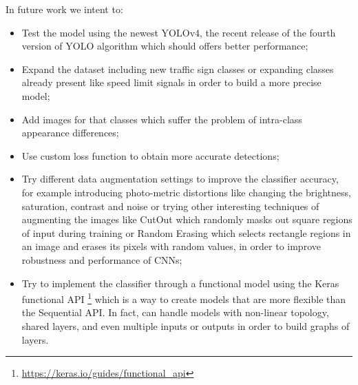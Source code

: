 \documentclass[10pt,twocolumn,letterpaper]{article}
\begin{document}
\noindent In future work we intent to:
\begin{itemize}[noitemsep,topsep=0pt]
	\item Test the model using the newest YOLOv4, the recent release of the fourth version of YOLO algorithm which should offers better performance;
	\item Expand the dataset including new traffic sign classes or expanding classes already present like speed limit signals in order to build a more precise model;
	\item Add images for that classes which suffer the problem of intra-class appearance differences;
	\item Use custom loss function to obtain more accurate detections;
	\item Try different data augmentation settings to improve the classifier accuracy, for example introducing photo-metric distortions like changing the brightness, saturation, contrast and noise or trying other interesting techniques of augmenting the images like CutOut\cite{cutout} which randomly masks out square regions of input during training  or Random Erasing\cite{random} which selects rectangle regions in an image and erases its pixels with random values, in order to improve robustness and performance of CNNs;
	\item Try to implement the classifier through a functional model using the Keras functional API \footnote{\url{https://keras.io/guides/functional_api}}  which is a way to create models that are more flexible than the Sequential API. In fact, can handle models with non-linear topology, shared layers, and even multiple inputs or outputs in order to build graphs of layers.
\end{itemize}
\end{document}
